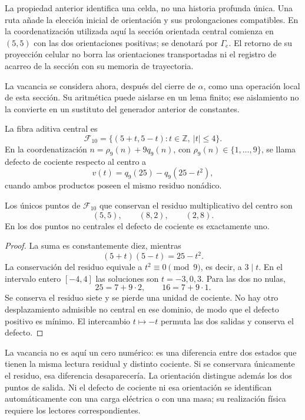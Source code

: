 La propiedad anterior identifica una celda, no una historia profunda
única. Una ruta añade la elección inicial de orientación y sus
prolongaciones compatibles. En la coordenatización utilizada aquí la sección
orientada central comienza en \((5,5)\) con las dos orientaciones
positivas; se denotará por \(\Gamma_e\). El retorno de su proyección
celular no borra las orientaciones transportadas ni el registro de
acarreo de la sección con su memoria de trayectoria.

La vacancia se considera ahora, después del cierre de \(\alpha\), como
una operación local de esta sección. Su aritmética puede aislarse en un
lema finito; ese aislamiento no la convierte en un sustituto del
generador anterior de constantes.

\begin{definition}
La fibra aditiva central es
\[
 \mathcal F_{10}
 =\{(5+t,5-t):t\in\mathbb Z,\ |t|\leq4\}.
\]
En la coordenatización \(n=\rho_9(n)+9q_9(n)\), con
\(\rho_9(n)\in\{1,\ldots,9\}\), se llama defecto de cociente respecto
al centro a
\[
 v(t)=q_9(25)-q_9(25-t^2),
\]
cuando ambos productos poseen el mismo residuo nonádico.
\end{definition}

\begin{lemma}
Los únicos puntos de \(\mathcal F_{10}\) que conservan el residuo
multiplicativo del centro son
\[
 (5,5),\qquad (8,2),\qquad (2,8).
\]
En los dos puntos no centrales el defecto de cociente es exactamente uno.
\end{lemma}
\begin{proof}
La suma es constantemente diez, mientras
\[
 (5+t)(5-t)=25-t^2.
\]
La conservación del residuo equivale a \(t^2\equiv0\pmod9\), es decir,
a \(3\mid t\). En el intervalo entero \([-4,4]\) las soluciones son
\(t=-3,0,3\). Para las dos no nulas,
\[
 25=7+9\cdot2,\qquad16=7+9\cdot1.
\]
Se conserva el residuo siete y se pierde una unidad de cociente. No hay
otro desplazamiento admisible no central en ese dominio, de modo que el
defecto positivo es mínimo. El intercambio \(t\mapsto-t\) permuta las
dos salidas y conserva el defecto.
\end{proof}

La vacancia no es aquí un cero numérico: es una diferencia entre dos
estados que tienen la misma lectura residual y distinto cociente. Si se
conservara únicamente el residuo, esa diferencia desaparecería. La
orientación distingue además los dos puntos de salida. Ni el defecto de
cociente ni esa orientación se identifican automáticamente con una carga
eléctrica o con una masa; su realización física requiere los lectores
correspondientes.

